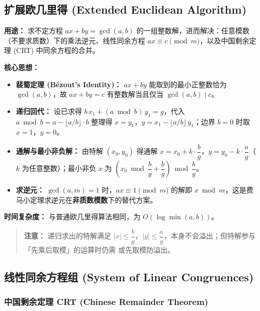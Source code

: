 \subsection{扩展欧几里得 (Extended Euclidean Algorithm)}

\textbf{用途：}
求不定方程 $ax + by = \gcd(a, b)$ 的一组整数解，进而解决：任意模数（不要求质数）下的乘法逆元、线性同余方程 $ax \equiv c \pmod{m}$，以及中国剩余定理 (CRT) 中同余方程的合并。

\textbf{核心思想：}
\begin{itemize}
    \item \textbf{裴蜀定理 (Bézout's Identity)：} $ax + by$ 能取到的最小正整数恰为 $\gcd(a, b)$，故 $ax + by = c$ 有整数解当且仅当 $\gcd(a, b) \mid c$。
    \item \textbf{递归回代：} 设已求得 $b\,x_1 + (a \bmod b)\,y_1 = g$，代入 $a \bmod b = a - \lfloor a/b \rfloor \cdot b$ 整理得 $x = y_1$，$y = x_1 - \lfloor a/b \rfloor\, y_1$；边界 $b = 0$ 时取 $x = 1$，$y = 0$。
    \item \textbf{通解与最小非负解：} 由特解 $(x_0, y_0)$ 得通解 $x = x_0 + k\cdot\dfrac{b}{g}$，$y = y_0 - k\cdot\dfrac{a}{g}$（$k$ 为任意整数）；最小非负 $x$ 为 $\left(x_0 \bmod \dfrac{b}{g} + \dfrac{b}{g}\right) \bmod \dfrac{b}{g}$。
    \item \textbf{求逆元：} $\gcd(a, m) = 1$ 时，$ax \equiv 1 \pmod{m}$ 的解即 $x \bmod m$，这是费马小定理求逆元在\textbf{非质数模数}下的替代方案。
\end{itemize}

\textbf{时间复杂度：} 与普通欧几里得算法相同，为 $O(\log \min(a, b))$。



\begin{quote}
\textbf{注意：} 递归求出的特解满足 $|x| \le \dfrac{b}{g}$，$|y| \le \dfrac{a}{g}$，本身不会溢出；但特解参与「先乘后取模」的运算时仍需  或先取模防溢出。
\end{quote}

\subsection{线性同余方程组 (System of Linear Congruences)}

\subsubsection{中国剩余定理 CRT (Chinese Remainder Theorem)}


